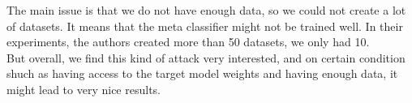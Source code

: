 \documentclass{article}
\begin{document}
The main issue is that we do not have enough data, so we could not create a lot of datasets. It means that the meta classifier might not be trained well. In their experiments, the authors created more than 50 datasets, we only had 10.\\

But overall, we find this kind of attack very interested, and on certain condition shuch as having access to the target model weights and having enough data, it might lead to very nice results.

\printbibliography
\end{document}
